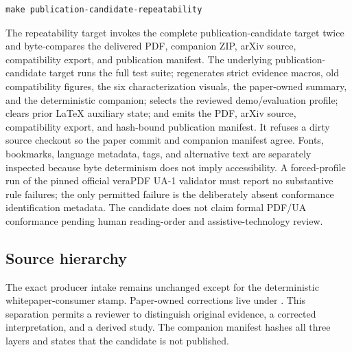 \begin{verbatim}
make publication-candidate-repeatability
\end{verbatim}

The repeatability target invokes the complete publication-candidate target twice and byte-compares
the delivered PDF, companion ZIP, arXiv source, compatibility export, and publication manifest. The
underlying publication-candidate target runs the full test suite; regenerates strict evidence
macros, old compatibility figures, the six characterization visuals, the paper-owned summary, and
the deterministic companion; selects the reviewed demo/evaluation profile; clears prior LaTeX
auxiliary state; and emits the PDF, arXiv source, compatibility export, and hash-bound publication
manifest. It refuses a dirty source checkout so the paper commit and companion manifest agree.
Fonts, bookmarks, language metadata, tags, and alternative text are separately inspected because
byte determinism does not imply accessibility. A forced-profile run of the pinned official veraPDF
UA-1 validator must report no substantive rule failures; the only permitted failure is the
deliberately absent conformance identification metadata. The candidate does not claim formal PDF/UA
conformance pending human reading-order and assistive-technology review.

\subsection{Source hierarchy}

The exact producer intake remains unchanged except for the deterministic whitepaper-consumer stamp.
Paper-owned corrections live under . This separation permits a
reviewer to distinguish original evidence, a corrected interpretation, and a derived study. The
companion manifest hashes all three layers and states that the candidate is not published.
